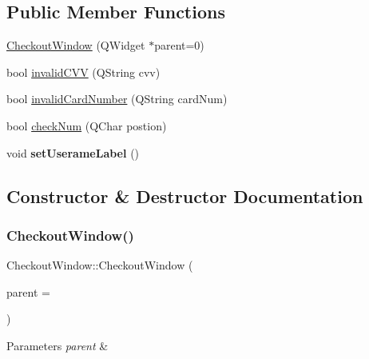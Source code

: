 \subsection*{Public Member Functions}
\begin{DoxyCompactItemize}
\item 
\hyperlink{class_checkout_window_aed570d8035e7c0b74108dc5dd5802e57}{Checkout\+Window} (Q\+Widget $\ast$parent=0)
\item 
bool \hyperlink{class_checkout_window_a5fab2958fac97a8a986065cb4ccf8d03}{invalid\+C\+VV} (Q\+String cvv)
\item 
bool \hyperlink{class_checkout_window_a28612fc41a4491136ae4327363cbeb74}{invalid\+Card\+Number} (Q\+String card\+Num)
\item 
bool \hyperlink{class_checkout_window_ad3d3908e0916fbb5abdc134d7d1bcb03}{check\+Num} (Q\+Char postion)
\item 
\mbox{\label{class_checkout_window_ad1f94db6289c46894f85e5c837922cc4}} 
void {\bfseries set\+Userame\+Label} ()
\end{DoxyCompactItemize}


\subsection{Constructor \& Destructor Documentation}
\mbox{\label{class_checkout_window_aed570d8035e7c0b74108dc5dd5802e57}} 
\subsubsection{\texorpdfstring{Checkout\+Window()}{CheckoutWindow()}}
{\footnotesize\ttfamily Checkout\+Window\+::\+Checkout\+Window (\begin{DoxyParamCaption}\item[{Q\+Widget $\ast$}]{parent = {} }\end{DoxyParamCaption})\hspace{0.3cm}{\ttfamily [explicit]}}


\begin{DoxyParams}{Parameters}
{\em parent} & \\
\hline
\end{DoxyParams}



